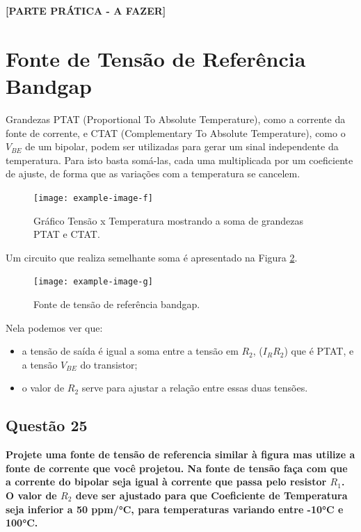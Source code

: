 ﻿\documentclass[12pt,a4paper]{article}
\begin{document}
\textbf{[PARTE PRÁTICA - A FAZER]}

\section*{Fonte de Tensão de Referência Bandgap}

Grandezas PTAT (Proportional To Absolute Temperature), como a corrente da fonte de corrente, e CTAT (Complementary To Absolute Temperature), como o $V_{BE}$ de um bipolar, podem ser utilizadas para gerar um sinal independente da temperatura. Para isto basta somá-las, cada uma multiplicada por um coeficiente de ajuste, de forma que as variações com a temperatura se cancelem.

\begin{figure}[H]
\centering
\texttt{[image: example-image-f]}
\caption{Gráfico Tensão x Temperatura mostrando a soma de grandezas PTAT e CTAT.}
\label{fig:bandgap_principle}
\end{figure}

Um circuito que realiza semelhante soma é apresentado na Figura \ref{fig:bandgap_circuit}.

\begin{figure}[H]
\centering
\texttt{[image: example-image-g]}
\caption{Fonte de tensão de referência bandgap.}
\label{fig:bandgap_circuit}
\end{figure}

Nela podemos ver que:
\begin{itemize}
    \item a tensão de saída é igual a soma entre a tensão em $R_2$, ($I_R R_2$) que é PTAT, e a tensão $V_{BE}$ do transistor;
    \item o valor de $R_2$ serve para ajustar a relação entre essas duas tensões.
\end{itemize}

\subsection*{Questão 25}
\textbf{Projete uma fonte de tensão de referencia similar à figura mas utilize a fonte de corrente que você projetou. Na fonte de tensão faça com que a corrente do bipolar seja igual à corrente que passa pelo resistor $R_1$. O valor de $R_2$ deve ser ajustado para que Coeficiente de Temperatura seja inferior a 50 ppm/°C, para temperaturas variando entre -10°C e 100°C.}
\end{document}
